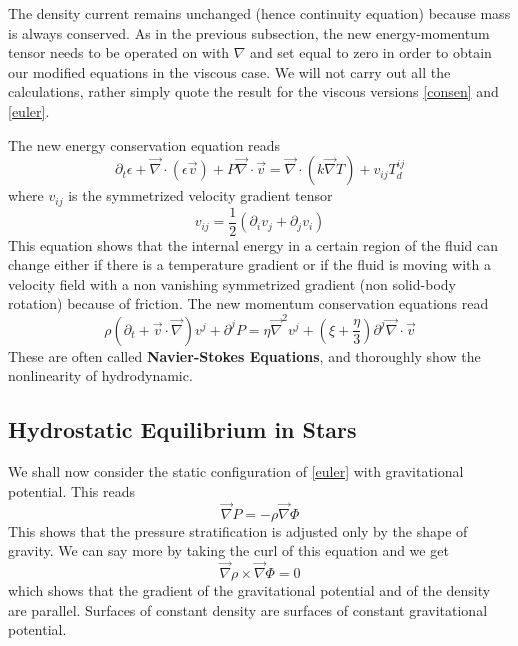 The density current remains unchanged (hence continuity equation) because mass is always conserved. As in the previous subsection, the new energy-momentum tensor needs to be operated on with $\nabla$ and set equal to zero in order to obtain our modified equations in the viscous case. We will not carry out all the calculations, rather simply quote the result for the viscous versions \ref{consen} and \ref{euler}. 

The new energy conservation equation reads
$$
\partial_t \epsilon + \vec \nabla \cdot (\epsilon \vec{v}) + P \vec \nabla \cdot \vec{v} = \vec \nabla \cdot (k \vec \nabla T) + v_{ij} T_d^{ij} 
$$
where $v_{ij}$ is the symmetrized velocity gradient tensor
$$
v_{ij} = \frac{1}{2}(\partial_i v_j + \partial_j v_i)
$$
This equation shows that the internal energy in a certain region of the fluid can change either if there is a temperature gradient or if the fluid is moving with a velocity field with a non vanishing symmetrized gradient (non solid-body rotation) because of friction.
The new momentum conservation equations read
$$
\rho \left( \partial_t + \vec{v} \cdot \vec \nabla \right) v^j+\partial^jP = \eta \vec \nabla^2v^j + \left( \xi + \frac{\eta}{3} \right) \partial^j \vec \nabla \cdot \vec{v}
$$
These are often called \textbf{Navier-Stokes Equations}, and thoroughly show the nonlinearity of hydrodynamic.

\subsection{Hydrostatic Equilibrium in Stars}
We shall now consider the static configuration of \ref{euler} with gravitational potential. This reads
\begin{equation} \label{hystat}
	\vec \nabla P = - \rho \vec \nabla \Phi
\end{equation}
This shows that the pressure stratification is adjusted only by the shape of gravity. We can say more by taking the curl of this equation and we get
$$
\vec \nabla \rho \times  \vec \nabla \Phi =0
$$
which shows that the gradient of the gravitational potential and of the density are parallel. Surfaces of constant density are surfaces of constant gravitational potential.

